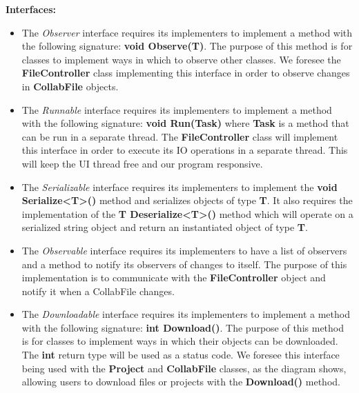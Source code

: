 \documentclass[twoside,letterpaper]{article}
\begin{document}
{\textbf{Interfaces:}\\
\begin{itemize}
	\item The \textit{Observer} interface requires its implementers to implement a method with the following signature: \textbf{void Observe(T)}. The purpose of this method is for classes to implement ways in which to observe other classes. We foresee the \textbf{FileController} class implementing this interface in order to observe changes in \textbf{CollabFile} objects.
	\item The \textit{Runnable} interface requires its implementers to implement a method with the following signature: \textbf{void Run(Task)} where \textbf{Task} is a method that can be run in a separate thread. The \textbf{FileController} class will implement this interface in order to execute its IO operations in a separate thread. This will keep the UI thread free and our program responsive.
	\item The \textit{Serializable} interface requires its implementers to implement the \textbf{void Serialize<T>()} method and serializes objects of type \textbf{T}. It also requires the implementation of the \textbf{T Deserialize<T>()} method which will operate on a serialized string object and return an instantiated object of type \textbf{T}.
	\item The \textit{Observable} interface requires its implementers to have a list of observers and a method to notify its observers of changes to itself. The purpose of this implementation is to communicate with the \textbf{FileController} object and notify it when a CollabFile changes.
	\item The \textit{Downloadable} interface requires its implementers to implement a method with the following signature: \textbf{int Download()}. The purpose of this method is for classes to implement ways in which their objects can be downloaded. The \textbf{int} return type will be used as a status code. We foresee this interface being used with the \textbf{Project} and \textbf{CollabFile} classes, as the diagram shows, allowing users to download files or projects with the \textbf{Download()} method.
\end{itemize}

}
\end{document}
